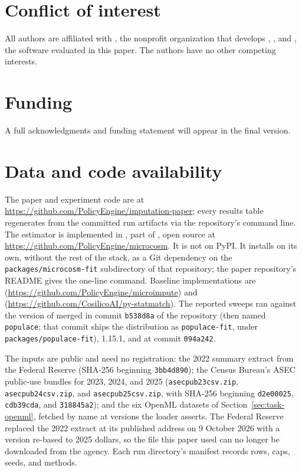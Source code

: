 \section*{Conflict of interest}

All authors are affiliated with \policyengine{}, the nonprofit organization
that develops \populace{}, \populacefit{}, and \microimpute{}, the software
evaluated in this paper. The authors have no other competing interests.

\section*{Funding}

A full acknowledgments and funding statement will appear in the final
version.

\section*{Data and code availability}

The paper and experiment code are at
\url{https://github.com/PolicyEngine/imputation-paper}; every results table
regenerates from the committed run artifacts via the repository's command
line. The estimator is implemented in \populacefit{}, part of \populace{},
open source at \url{https://github.com/PolicyEngine/microcosm}. It is not
on PyPI. It installs on its own, without the rest of the stack, as a Git
dependency on the \texttt{packages/microcosm-fit} subdirectory of that
repository; the paper repository's README gives the one-line command.
Baseline implementations are \microimpute{}
(\url{https://github.com/PolicyEngine/microimpute}) and \pystatmatch{}
(\url{https://github.com/CosilicoAI/py-statmatch}). The reported sweeps ran
against the version of \populacefit{} merged in commit \texttt{b538d8a} of
the \populace{} repository (then named \texttt{populace}; that commit ships
the distribution as \texttt{populace-fit}, under
\texttt{packages/populace-fit}), \microimpute{} 1.15.1, and \pystatmatch{}
at commit \texttt{094a242}.

The inputs are public and need no registration: the \scf{} 2022 summary
extract from the Federal Reserve (SHA-256 beginning \texttt{3bb4d890}); the
Census Bureau's ASEC public-use bundles for 2023, 2024, and 2025
(\texttt{asecpub23csv.zip}, \texttt{asecpub24csv.zip}, and
\texttt{asecpub25csv.zip}, with SHA-256 beginning \texttt{d2e00025},
\texttt{cdb39cda}, and \texttt{318845a2}); and the six OpenML datasets of
Section~\ref{sec:task-openml}, fetched by name at versions the loader
asserts. The Federal Reserve replaced the 2022 extract at its published
address on 9 October 2026 with a version re-based to 2025 dollars, so the
file this paper used can no longer be downloaded from the agency.
Each run directory's manifest records rows, caps, seeds, and methods.
